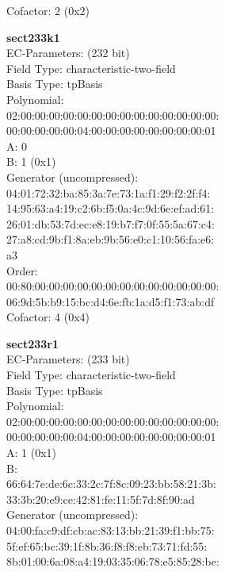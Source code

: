 Cofactor:  2 (0x2)\\
\item \textbf{ sect233k1 }\\
EC-Parameters: (232 bit)\\
Field Type: characteristic-two-field\\
Basis Type: tpBasis\\
Polynomial:\\
    02:00:00:00:00:00:00:00:00:00:00:00:00:00:00:\\
    00:00:00:00:00:04:00:00:00:00:00:00:00:00:01\\
A:    0\\
B:    1 (0x1)\\
Generator (uncompressed):\\
    04:01:72:32:ba:85:3a:7e:73:1a:f1:29:f2:2f:f4:\\
    14:95:63:a4:19:c2:6b:f5:0a:4c:9d:6e:ef:ad:61:\\
    26:01:db:53:7d:ec:e8:19:b7:f7:0f:55:5a:67:c4:\\
    27:a8:cd:9b:f1:8a:eb:9b:56:e0:c1:10:56:fa:e6:\\
    a3\\
Order: \\
    00:80:00:00:00:00:00:00:00:00:00:00:00:00:00:\\
    06:9d:5b:b9:15:bc:d4:6e:fb:1a:d5:f1:73:ab:df\\
Cofactor:  4 (0x4)\\
\item \textbf{ sect233r1 }\\
EC-Parameters: (233 bit)\\
Field Type: characteristic-two-field\\
Basis Type: tpBasis\\
Polynomial:\\
    02:00:00:00:00:00:00:00:00:00:00:00:00:00:00:\\
    00:00:00:00:00:04:00:00:00:00:00:00:00:00:01\\
A:    1 (0x1)\\
B:   \\
    66:64:7e:de:6c:33:2c:7f:8c:09:23:bb:58:21:3b:\\
    33:3b:20:e9:ce:42:81:fe:11:5f:7d:8f:90:ad\\
Generator (uncompressed):\\
    04:00:fa:c9:df:cb:ac:83:13:bb:21:39:f1:bb:75:\\
    5f:ef:65:bc:39:1f:8b:36:f8:f8:eb:73:71:fd:55:\\
    8b:01:00:6a:08:a4:19:03:35:06:78:e5:85:28:be:\\
